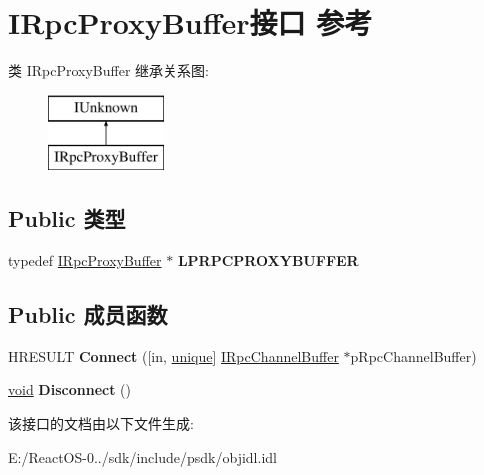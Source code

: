 \hypertarget{interface_i_rpc_proxy_buffer}{}\section{I\+Rpc\+Proxy\+Buffer接口 参考}
\label{interface_i_rpc_proxy_buffer}
类 I\+Rpc\+Proxy\+Buffer 继承关系图\+:\begin{figure}[H]
\begin{center}
\leavevmode
\includegraphics[height=2.000000cm]{interface_i_rpc_proxy_buffer}
\end{center}
\end{figure}
\subsection*{Public 类型}
\begin{DoxyCompactItemize}
\item 
\mbox{\label{interface_i_rpc_proxy_buffer_a9afc94252527bd4da2585cb459b7cfe3}} 
typedef \hyperlink{interface_i_rpc_proxy_buffer}{I\+Rpc\+Proxy\+Buffer} $\ast$ {\bfseries L\+P\+R\+P\+C\+P\+R\+O\+X\+Y\+B\+U\+F\+F\+ER}
\end{DoxyCompactItemize}
\subsection*{Public 成员函数}
\begin{DoxyCompactItemize}
\item 
\mbox{\label{interface_i_rpc_proxy_buffer_aa4b405974924c724e9f69db841946217}} 
H\+R\+E\+S\+U\+LT {\bfseries Connect} (\mbox{[}in, \hyperlink{interfaceunique}{unique}\mbox{]} \hyperlink{interface_i_rpc_channel_buffer}{I\+Rpc\+Channel\+Buffer} $\ast$p\+Rpc\+Channel\+Buffer)
\item 
\mbox{\label{interface_i_rpc_proxy_buffer_a6d69d9bf472721ea12ad6fac55ee59b7}} 
\hyperlink{interfacevoid}{void} {\bfseries Disconnect} ()
\end{DoxyCompactItemize}


该接口的文档由以下文件生成\+:\begin{DoxyCompactItemize}
\item 
E\+:/\+React\+O\+S-\/0../sdk/include/psdk/objidl.\+idl\end{DoxyCompactItemize}
